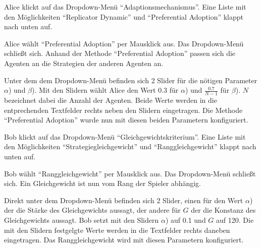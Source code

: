 \documentclass[parskip=full,11pt]{scrartcl}
\begin{document}

{Alice klickt auf das Dropdown-Menü \enquote{Adaptionsmechanismus}.}
{Eine Liste mit den Möglichkeiten \enquote{Replicator Dynamic} und  \enquote{Preferential Adoption} klappt nach unten auf.}

{Alice wählt \enquote{Preferential Adoption} per Mausklick aus.}
{Das Dropdown-Menü schließt sich. Anhand der Methode  \enquote{Preferential Adoption} passen sich die Agenten an die Strategien der anderen Agenten an.}

{Unter dem dem Dropdown-Menü befinden sich 2 Slider für die nötigen Parameter \(\alpha\)) und \(\beta\)). Mit den Slidern wählt Alice den Wert 0.3 für \(\alpha\)) und \(\frac{0.7}{N - 1}\) für  \(\beta\)). \(N\) bezeichnet dabei die Anzahl der Agenten.}
{Beide Werte werden in die entprechenden Textfelder rechts neben den Slidern eingetragen. Die Methode \enquote{Preferential Adoption} wurde nun mit diesen beiden Parametern konfiguriert.}


{Bob klickt auf das Dropdown-Menü \enquote{Gleichgewichtskriterium}.}
{Eine Liste mit den Möglichkeiten \enquote{Strategiegleichgewicht} und  \enquote{Ranggleichgewicht} klappt nach unten auf.}

{Bob wählt \enquote{Ranggleichgewicht} per Mausklick aus.}
{Das Dropdown-Menü schließt sich. Ein Gleichgewicht ist nun vom Rang der Spieler abhängig.}

{Direkt unter dem Dropdown-Menü befinden sich 2 Slider, einen für den Wert \(\alpha\)) der die Stärke des Gleichgewichts aussagt, der andere für \(G\) der die Konstanz des Gleichgewichts aussagt. Bob setzt mit den Slidern \(\alpha\)) auf 0.1 und  \(G\) auf 120.}
{Die mit den Slidern festgelgte Werte werden in die Textfelder rechts daneben eingetragen. Das Ranggleichgewicht wird mit diesen Parametern konfiguriert.}
\end{document}
